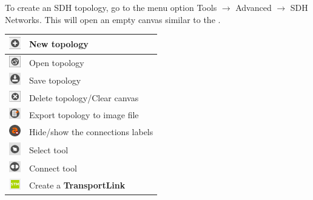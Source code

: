 \documentclass[a4paper]{article}
\begin{document}
		\newpage
		To create an SDH topology, go to the menu option Tools $\rightarrow$ Advanced $\rightarrow$ SDH Networks. This will open an empty canvas similar to the .
		\begin{table}[h!]
			\centering
			\begin{tabular}{lp{10cm}}
				\includegraphics[width=0.5cm]{img/icon_new_element.png} & New topology \\
				\midrule
				\includegraphics[width=0.5cm]{img/icon_open.png} & Open topology \\
				\midrule
				\includegraphics[width=0.5cm]{img/icon_save.png} & Save topology \\
				\midrule
				\includegraphics[width=0.5cm]{img/icon_delete.png} & Delete topology/Clear canvas \\
				\midrule
				\includegraphics[width=0.5cm]{img/icon_export.png} & Export topology to image file \\
				\midrule
				\includegraphics[width=0.5cm]{img/icon_toggle_conn_labels.png} & Hide/show the connections labels\\
				\midrule
				\includegraphics[width=0.5cm]{img/icon_select_tool.png} & Select tool \\
				\midrule
				\includegraphics[width=0.5cm]{img/icon_connect_tool.png} & Connect tool \\
				\midrule
				\includegraphics[width=0.5cm]{img/sdh_module_transport_link.png} & Create a \textbf{TransportLink} \\

\end{tabular}
\end{table}
\end{document}
